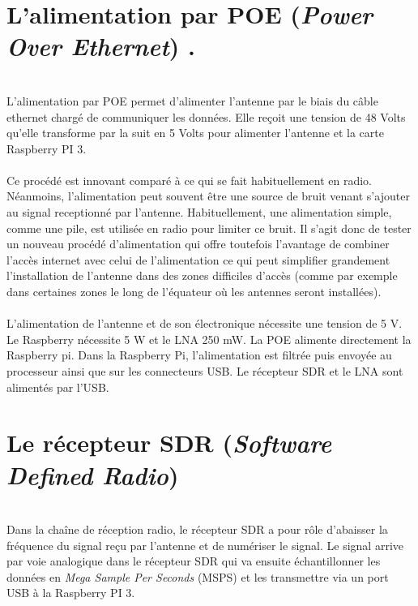 \documentclass[12pt,fleqn]{book} %
\begin{document}
\section{L'alimentation par POE (\emph{Power Over Ethernet})  \color{white}.}
~\\\indent L'alimentation par POE permet d'alimenter l'antenne par le biais du câble ethernet chargé de communiquer les données. Elle reçoit une tension de 48 Volts qu'elle transforme par la suit en 5 Volts pour alimenter l'antenne et la carte Raspberry PI 3.
~\\\\Ce procédé est innovant comparé à ce qui se fait habituellement en radio. Néanmoins, l'alimentation peut souvent être une source de bruit venant s'ajouter au signal receptionné par l'antenne. Habituellement, une alimentation simple, comme une pile, est utilisée en radio pour limiter ce bruit. Il s'agit donc de tester un nouveau procédé d'alimentation qui offre toutefois l'avantage de combiner l'accès internet avec celui de l'alimentation ce qui peut simplifier grandement l'installation  
de l'antenne dans des zones difficiles d'accès (comme par exemple dans certaines zones le long de l'équateur où les antennes seront installées).
~\\\\L’alimentation de l’antenne et de son électronique nécessite une tension de 5 V. Le Raspberry nécessite 5 W et le LNA 250 mW. La POE alimente directement la Raspberry pi. Dans la Raspberry Pi, l’alimentation est filtrée puis envoyée au processeur ainsi que sur les connecteurs USB. Le récepteur SDR et le LNA sont alimentés par l’USB.
\section{Le récepteur SDR (\emph{Software Defined Radio})}
~\\\indent Dans la chaîne de réception radio, le récepteur SDR a pour rôle d'abaisser la fréquence du signal reçu par l'antenne et de numériser le signal. Le signal arrive par voie analogique dans le récepteur SDR qui va ensuite échantillonner les données en \emph{Mega Sample Per Seconds} (MSPS) et les transmettre via un port USB à la Raspberry PI 3.
\end{document}
